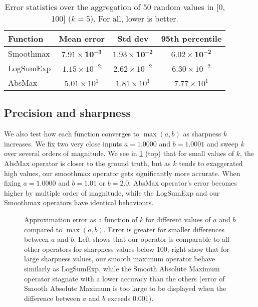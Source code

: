 \begin{table}
    \centering
    \begin{tabular}{l|ccc}
        \toprule
        Function & Mean error & Std dev & 95th percentile \\
        \midrule
        Smoothmax & $\mathbf{7.91 \times 10^{-3}}$ & $\mathbf{1.93 \times 10^{-2}}$ & $\mathbf{6.02 \times 10^{-2}}$ \\
        LogSumExp & $1.15 \times 10^{-2}$ & $2.62 \times 10^{-2}$ & $6.30 \times 10^{-2}$ \\
        AbsMax    & $5.01 \times 10^{1}$  & $1.81 \times 10^{1}$  & $7.77 \times 10^{1}$ \\
        \bottomrule
    \end{tabular}
    \caption{Error statistics over the aggregation of 50 random values in [0, 100] ($k = 5$). For all, lower is better. }
    \label{tab:smoothmax-avg-error}
\end{table}

\subsection*{Precision and sharpness}

We also test how each function converges to $\max(a, b)$ as sharpness $k$ increases. We fix two very close inputs $a = 1.0000$ and $b = 1.0001$ and sweep $k$ over several orders of magnitude. We see in \cref{fig:smoothmax-sharpness} (top) that for small values of $k$, the AbsMax operator is closer to the ground truth, but as $k$ tends to exaggerated high values, our smoothmax operator gets significantly more accurate. When fixing $a = 1.0000$ and $b = 1.01$ or $b = 2.0$, AbsMax operator's error becomes higher by multiple order of magnitude, while the LogSumExp and our Smoothmax operators have identical behaviours.

\begin{figure}[H]
    \centering
    \caption{Approximation error as a function of $k$ for different values of $a$ and $b$ compared to $\max(a, b)$. Error is greater for smaller differences between $a$ and $b$. Left shows that our operator is comparable to all other operators for sharpness values below 100; right show that for large sharpness values, our smooth maximum operator behave similarly as LogSumExp, while the Smooth Absolute Maximum operator stagnate with a lower accuracy than the others (error of Smooth Absolute Maximum is too large to be displayed when the difference between $a$ and $b$ exceeds 0.001). }
    \label{fig:smoothmax-sharpness}
\end{figure}

